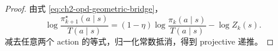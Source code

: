 \begin{proof}
由式 \eqref{eq:ch2-opd-geometric-bridge}，
\[
\log\frac{\pi_{k+1}^{\star}(a\mid s)}{T(a\mid s)}
=(1-\eta)\log\frac{\pi_k(a\mid s)}{T(a\mid s)}-\log Z_k(s).
\]
减去任意两个 action 的等式，归一化常数抵消，得到 projective 递推。
\end{proof}





